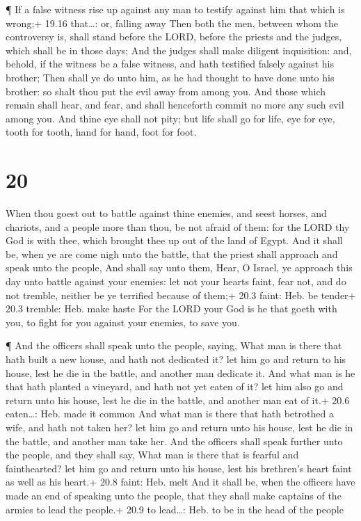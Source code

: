  ¶ If a false witness rise up against any man to testify
against him that which is wrong;+ 19.16 that\ldots: or, falling away
 Then both the men, between whom the controversy is, shall
stand before the LORD, before the priests and the judges, which shall be
in those days;  And the judges shall make diligent
inquisition: and, behold, if the witness be a false witness, and hath
testified falsely against his brother;  Then shall ye do
unto him, as he had thought to have done unto his brother: so shalt thou
put the evil away from among you.  And those which remain
shall hear, and fear, and shall henceforth commit no more any such evil
among you.  And thine eye shall not pity; but life shall go
for life, eye for eye, tooth for tooth, hand for hand, foot for foot.

\hypertarget{section-19}{%
\section{20}\label{section-19}}

 When thou goest out to battle against thine enemies, and
seest horses, and chariots, and a people more than thou, be not afraid
of them: for the LORD thy God is with thee, which brought thee up out of
the land of Egypt.  And it shall be, when ye are come nigh
unto the battle, that the priest shall approach and speak unto the
people,  And shall say unto them, Hear, O Israel, ye
approach this day unto battle against your enemies: let not your hearts
faint, fear not, and do not tremble, neither be ye terrified because of
them;+ 20.3 faint: Heb. be tender+ 20.3 tremble: Heb. make haste
 For the LORD your God is he that goeth with you, to fight
for you against your enemies, to save you.

 ¶ And the officers shall speak unto the people, saying,
What man is there that hath built a new house, and hath not dedicated
it? let him go and return to his house, lest he die in the battle, and
another man dedicate it.  And what man is he that hath
planted a vineyard, and hath not yet eaten of it? let him also go and
return unto his house, lest he die in the battle, and another man eat of
it.+ 20.6 eaten\ldots: Heb. made it common  And what man is
there that hath betrothed a wife, and hath not taken her? let him go and
return unto his house, lest he die in the battle, and another man take
her.  And the officers shall speak further unto the people,
and they shall say, What man is there that is fearful and fainthearted?
let him go and return unto his house, lest his brethren's heart faint as
well as his heart.+ 20.8 faint: Heb. melt  And it shall be,
when the officers have made an end of speaking unto the people, that
they shall make captains of the armies to lead the people.+ 20.9 to
lead\ldots: Heb. to be in the head of the people

